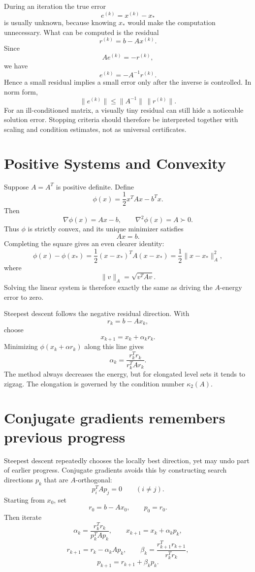 During an iteration the true error
\[
  e^{(k)}=x^{(k)}-x_*
\]
is usually unknown, because knowing \(x_*\) would make the computation unnecessary.  What can be computed is the residual
\[
  r^{(k)}=b-Ax^{(k)}.
\]
Since
\[
  Ae^{(k)}=-r^{(k)},
\]
we have
\[
  e^{(k)}=-A^{-1}r^{(k)}.
\]
Hence a small residual implies a small error only after the inverse is controlled.  In norm form,
\[
  \|e^{(k)}\|\le \|A^{-1}\|\,\|r^{(k)}\|.
\]
For an ill-conditioned matrix, a visually tiny residual can still hide a noticeable solution error.  Stopping criteria should therefore be interpreted together with scaling and condition estimates, not as universal certificates.

\section{Positive Systems and Convexity}

Suppose \(A=A^T\) is positive definite.  Define
\[
  \phi(x)=\frac12 x^TAx-b^Tx.
\]
Then
\[
  \nabla\phi(x)=Ax-b,
  \qquad
  \nabla^2\phi(x)=A\succ0.
\]
Thus \(\phi\) is strictly convex, and its unique minimizer satisfies
\[
  Ax=b.
\]
Completing the square gives an even clearer identity:
\[
  \phi(x)-\phi(x_*)
  =\frac12(x-x_*)^TA(x-x_*)
  =\frac12\|x-x_*\|_A^2,
\]
where
\[
  \|v\|_A=\sqrt{v^TAv}.
\]
Solving the linear system is therefore exactly the same as driving the \(A\)-energy error to zero.

Steepest descent follows the negative residual direction.  With
\[
  r_k=b-Ax_k,
\]
choose
\[
  x_{k+1}=x_k+\alpha_k r_k.
\]
Minimizing \(\phi(x_k+\alpha r_k)\) along this line gives
\[
  \alpha_k=\frac{r_k^Tr_k}{r_k^TAr_k}.
\]
The method always decreases the energy, but for elongated level sets it tends to zigzag.  The elongation is governed by the condition number \(\kappa_2(A)\).

\section{Conjugate gradients remembers previous progress}

Steepest descent repeatedly chooses the locally best direction, yet may undo part of earlier progress.  Conjugate gradients avoids this by constructing search directions \(p_k\) that are \(A\)-orthogonal:
\[
  p_i^TAp_j=0\qquad(i\ne j).
\]
Starting from \(x_0\), set
\[
  r_0=b-Ax_0,
  \qquad p_0=r_0.
\]
Then iterate
\[
  \alpha_k=\frac{r_k^Tr_k}{p_k^TAp_k},
  \qquad
  x_{k+1}=x_k+\alpha_kp_k,
\]
\[
  r_{k+1}=r_k-\alpha_kAp_k,
  \qquad
  \beta_k=\frac{r_{k+1}^Tr_{k+1}}{r_k^Tr_k},
\]
\[
  p_{k+1}=r_{k+1}+\beta_kp_k.
\]

